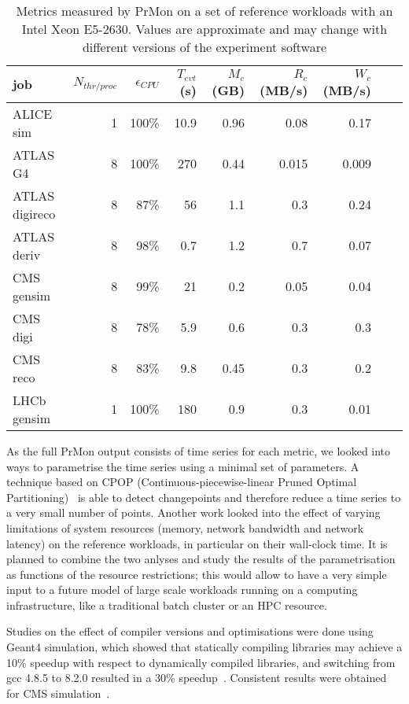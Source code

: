 \begin{table}
\centering
\caption{Metrics measured by PrMon on a set of reference workloads with an Intel Xeon E5-2630. Values are approximate and may change with different versions of the experiment software}
\label{table:prmon}
\begin{tabular}{lrrrrrrrr}
\hline
job & $N_{thr/proc}$ & $\epsilon_{CPU}$ & $T_{evt}$ (s) & $M_{c}$ (GB) & $R_{c}$ (MB/s) & $W_{c}$ (MB/s) \\\hline
ALICE sim & 1 & 100\% & 10.9 & 0.96 & 0.08 & 0.17 \\
ATLAS G4 & 8 & 100\% & 270 & 0.44 & 0.015 & 0.009 \\
ATLAS digireco & 8 & 87\% & 56 & 1.1 & 0.3 & 0.24 \\
ATLAS deriv & 8 & 98\% & 0.7 & 1.2 & 0.7 & 0.07 \\
CMS gensim & 8 & 99\% & 21 & 0.2 & 0.05 & 0.04 \\
CMS digi & 8 & 78\% & 5.9 & 0.6 & 0.3 & 0.3 \\
CMS reco & 8 & 83\% & 9.8 & 0.45 & 0.3 & 0.2 \\
LHCb gensim & 1 & 100\% & 180 & 0.9 & 0.3 & 0.01 \\\hline
\end{tabular}
\end{table}
As the full PrMon output consists of time series for each metric, we
looked into ways to parametrise the time series using a minimal set of
parameters. A technique based on CPOP (Continuous-piecewise-linear
Pruned Optimal Partitioning)~\cite{cpop} is able to detect
changepoints and therefore reduce a time series to a very small number
of points. Another work looked into the effect of varying limitations
of system resources (memory, network bandwidth and network latency) on
the reference workloads, in particular on their wall-clock time. It is
planned to combine the two anlyses and study the results of the
parametrisation as functions of the resource restrictions; this would
allow to have a very simple input to a future model of large scale
workloads running on a computing infrastructure, like a traditional
batch cluster or an HPC resource.

Studies on the effect of compiler versions and optimisations were done using
Geant4 simulation, which showed that statically compiling libraries may achieve a 10\% speedup with respect to dynamically compiled libraries, and switching from gcc 4.8.5 to 8.2.0 resulted in a 30\% speedup~\cite{marcon}. Consistent results were obtained for CMS simulation~\cite{alejandro}.

